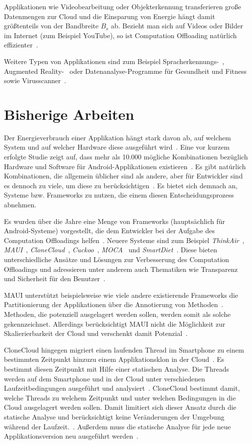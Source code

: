 \documentclass{sigchi}
\begin{document}
Applikationen wie Videobearbeitung oder Objekterkennung transferieren große Datenmengen zur Cloud und die Einsparung von Energie hängt damit größtenteils von der Bandbreite $B_s$ ab.
Bezieht man sich auf Videos oder Bilder im Internet (zum Beispiel YouTube), so ist Computation Offloading natürlich effizienter~\cite{o4}.

Weitere Typen von Applikationen sind zum Beispiel Sprach\-er\-kenn\-ungs-~\cite{thinkair}, Augmented Reality-~\cite{O13} oder Da\-ten\-analyse-Programme für Gesundheit und Fitness~\cite{clonecloud} sowie Virusscanner~\cite{thinkair}.

\section{Bisherige Arbeiten}

Der Energieverbrauch einer Applikation hängt stark davon ab, auf welchem System und auf welcher Hardware diese ausgeführt wird~\cite{seeds}.
Eine vor kurzem erfolgte Studie zeigt auf, dass mehr als 10.000 mögliche Kombinationen bezüglich Hardware und Software für Android-Applikationen existieren~\cite{seeds-34}.
Es gibt natürlich Kombinationen, die allgemein üblicher sind als andere, aber für Entwickler sind es dennoch zu viele, um diese zu berücksichtigen~\cite{seeds}.
Es bietet sich demnach an, Systeme bzw. Frameworks zu nutzen, die einem diesen Entscheidungsprozess abnehmen.

Es wurden über die Jahre eine Menge von Frameworks (hauptsächlich für Android-Systeme) vorgestellt, die dem Entwickler bei der Aufgabe des Computation Offloadings helfen~\cite{o4}.
Neuere Systeme sind zum Beispiel \emph{ThinkAir}~\cite{thinkair}, \emph{MAUI}~\cite{maui}, \emph{CloneCloud}~\cite{clonecloud}, \emph{Cuckoo}~\cite{cuckoo}, \emph{MOCA}~\cite{moca} und \emph{SmartDiet}~\cite{smartdiet}.
Diese bieten unterschiedliche Ansätze und Lösungen zur Verbesserung des Computation Offloadings und adressieren unter anderem auch Thematiken wie Transparenz und Sicherheit für den Benutzer~\cite{o4}.

MAUI unterstützt beispielsweise wie viele andere existierende Frameworks die Partitionierung der Applikationen über die Annotierung von Methoden~\cite{maui}.
Methoden, die potenziell ausgelagert werden sollen, werden somit als solche gekennzeichnet.
Allerdings berücksichtigt MAUI nicht die Möglichkeit zur Skalierierbarkeit der Cloud und verschenkt damit Potenzial~\cite{maui, thinkair}.

CloneCloud hingegen migriert einen laufenden Thread im Smartphone zu einem bestimmten Zeitpunkt hinzuzu einem Applikationsklon in der Cloud~\cite{clonecloud}.
Es bestimmt diesen Zeitpunkt mit Hilfe einer statischen Analyse.
Die Threads werden auf dem Smartphone und in der Cloud unter verschiedenen Laufzeitbedingungen ausgeführt und analysiert~\cite{clonecloud}.
CloneCloud bestimmt damit, welche Threads zu welchem Zeitpunkt und unter welchen Bedingungen in die Cloud ausgelagert werden sollen.
Damit limitiert sich dieser Ansatz durch die statische Analyse und berücksichtigt keine Veränderungen der Umgebung während der Laufzeit.~\cite{thinkair}.
Außerdem muss die statische Analyse für jede neue Applikationsversion neu ausgeführt werden~\cite{thinkair}.
\end{document}
